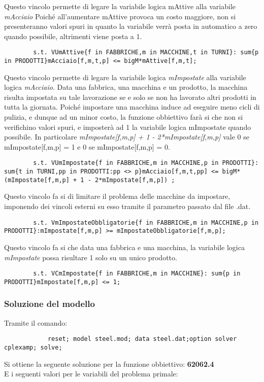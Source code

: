 \documentclass[12pt]{article} %
\begin{document}
		Questo vincolo permette di legare la variabile logica mAttive alla variabile \textit{mAcciaio}
		Poich\'e all'aumentare mAttive provoca un costo maggiore, non si presenteranno valori spuri in quanto la variabile verrà posta in automatico a zero quando possibile, altrimenti viene posta a 1.
		\begin{lstlisting}
		s.t. VUmAttive{f in FABBRICHE,m in MACCHINE,t in TURNI}: sum{p in PRODOTTI}mAcciaio[f,m,t,p] <= bigM*mAttive[f,m,t];
		\end{lstlisting}

		Questo vincolo permette di legare la variabile logica \textit{mImpostate} alla variabile logica \textit{mAcciaio}.
		Data una fabbrica, una macchina e un prodotto, la macchina risulta impostata su tale lavorazione se e solo se non ha lavorato altri prodotti in tutta la giornata.
		Poich\'e impostare una macchina induce ad eseguire meno cicli di pulizia, e dunque ad un minor costo, la funzione obbiettivo farà si che non si verifichino valori spuri, e imposterà ad 1 la variabile logica mImpostate quando possibile.
		In particolare \textit{mImpostate[f,m,p] + 1 - 2*mImpostate[f,m,p]} vale 0 se mImpostate[f,m,p] = 1 e 0 se mImpostate[f,m,p] = 0.
		\begin{lstlisting}
		s.t. VUmImpostate{f in FABBRICHE,m in MACCHINE,p in PRODOTTI}:  sum{t in TURNI,pp in PRODOTTI:pp <> p}mAcciaio[f,m,t,pp] <= bigM*(mImpostate[f,m,p] + 1 - 2*mImpostate[f,m,p]) ;
		\end{lstlisting}

		Questo vincolo fa si di limitare il problema delle macchine da impostare, imponendo dei vincoli esterni su esso tramite il parametro passato dal file .dat.
		\begin{lstlisting}
		s.t. VmImpostateObbligatorie{f in FABBRICHE,m in MACCHINE,p in PRODOTTI}:mImpostate[f,m,p] >= mImpostateObbligatorie[f,m,p];
		\end{lstlisting}

		Questo vincolo fa si che data una fabbrica e una macchina, la variabile logica \textit{mImpostate} possa risultare 1 solo su un unico prodotto.
		\begin{lstlisting}
		s.t. VCmImpostate{f in FABBRICHE,m in MACCHINE}: sum{p in PRODOTTI}mImpostate[f,m,p] <= 1;
		\end{lstlisting}



		\subsubsection{Soluzione del modello}
		Tramite il comando:
		\begin{lstlisting}
			reset; model steel.mod; data steel.dat;option solver cplexamp; solve;
		\end{lstlisting}
		Si ottiene la seguente soluzione per la funzione obbiettivo: \textbf{62062.4}\\
		E i seguenti valori per le variabili del problema primale:
\end{document}
